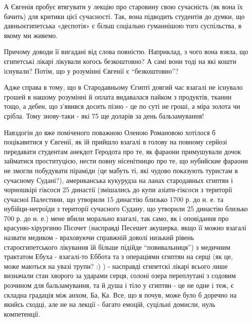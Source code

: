 А Євгенія пробує втягувати у лекцію про старовину свою сучасність (як вона їх
бачить) для критики цієї сучасності. Так, вона підводить студентів до думки, що
давньоєгипетська «деспотія» є більш соціально гуманнішою того суспільства, в
якому ми живемо. 

Причому доводи її вигадані від слова повністю. Наприклад, з чого вона взяла, що
єгипетські лікарі лікували когось безкоштовно? А самі вони тоді на які кошти
існували? Потім, що у розумінні Євгенії є \enquote{безкоштовно}?

Адже справа в тому, що в Стародавньому Єгипті довгий час взагалі не існувало
грошей в нашому розумінні й оплата видавалася пайком з продуктів, тканин тощо,
а дебен, що з'явився досить пізно - це по суті не гроші, а міра золота чи
срібла. Тому знову-таки - які 75 ще доларів за день бальзамування! 

Навздогін до вже поміченого поважною Оленою Романовою хотілося б поцікавитися у
Євгенії, як їй прийшло взагалі в голову на повному серйозі передавати студентам
анекдот Геродота про те, як фараони примушували дочок займатися проституцією,
нести повну нісенітницю про те, що нубийские фараони не змогли побудувати
піраміди (це мабуть ті, які чудово показують туристам в сучасному Судані?),
американська кукурудза на ланах стародавных єгиптян і чорношкірі гіксоси 25
династії (змішались до купи азіати-гіксоси з території сучасної Палестини, що
утворили 15 династію близько 1700 р. до н. е. та нубійци-негроїди з території
сучасного Судану, що утворили 25 династію близько 700 р. до н. е.) мене вбили
морально взагалі, так само, як і оповідання про красуню-хірургиню Пісочет
(насправді Песешет акушерка, якщо її можно взагалі назвати медиком - враховуючи
справжній доволі низький рівень староєгипетського лікування їй більше підійде
\enquote{повивальниця}) з медичним трактатом Ебуха - взагалі-то Еббота та з
операціями єгиптян на серці (як це, може маються на увазі трупи? :) ) -
насправді єгипетскі лікарі всього лише визначали стан хворого за ударами серця,
солоні озера переплутані з содовим розчином для бальзамування, та й душа і тіло
у єгиптян - це не одне і теж, є складна градація між анхом, Ба, Ка. Все, що я
почув, може було б доречно на якийсь сходці, але не на лекції - багато емоцій,
суцільні домисли, нуль компетенції.

